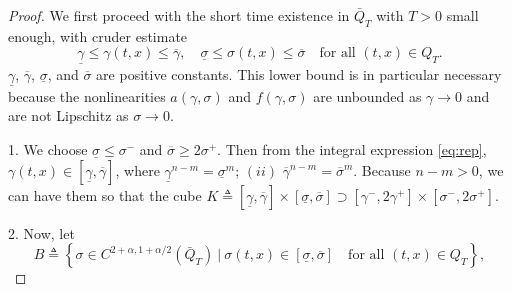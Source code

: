 \documentclass[a4paper,11pt]{article}
\newtheorem{proposition}{Proposition}[section]
\theoremstyle{remark}
\begin{document}
\begin{proof}
We first proceed with the short time existence in $\bar{Q}_{T}$ with $T>0$ small enough, with cruder estimate
\begin{equation}\underline\gamma \le \gamma(t,x) \le \overline\gamma, \quad \underline\sigma \le \sigma(t,x) \le \overline\sigma \quad \text{for all $(t,x)\in Q_T$}.\label{eq:cruder} \end{equation}
$\underline\gamma$, $\overline\gamma$, $\underline\sigma$, and $\overline\sigma$ are positive constants. This lower bound is in particular necessary because the nonlinearities $a(\gamma,\sigma)$ and $f(\gamma,\sigma)$ are unbounded as $\gamma \rightarrow 0$ and are not Lipschitz as $\sigma \rightarrow 0$. 

1. We choose $\underline{\sigma}\le \sigma^-$ and $\overline{\sigma}\ge 2\sigma^+$. Then from the integral expression \eqref{eq:rep}, $\gamma(t,x) \in [\underline{\gamma},\overline\gamma]$, where $\underline\gamma^{n-m} = \underline\sigma^m$; $(ii)$ $\overline\gamma^{n-m} = \overline\sigma^m$. Because $n-m>0$, we can have them so that the cube $K\triangleq[\underline{\gamma},\overline{\gamma}]\times[\underline\sigma,\overline\sigma] \supset [\gamma^-,2\gamma^+]\times[\sigma^-,2\sigma^+]$.
% 
% 



2. Now, let $$B\triangleq\left\{\sigma \in C^{2+\alpha,1+\alpha/2}(\bar{Q}_T) ~\Big|~ \sigma(t,x) \in [\underline\sigma, \overline\sigma] \quad \text{for all $(t,x)\in Q_T$}\right\},$$ 







\end{proof}
\end{document}
